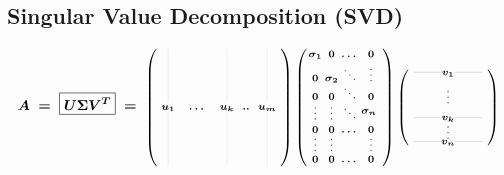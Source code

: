 \documentclass[12pt]{article}
\begin{document}
\newpage
\subsection{Singular Value Decomposition (SVD)}
\vspace{5pt}
\[ \boldsymbol{ \arraycolsep=3pt
	\begin{array}{c c c c l}
		A &=& \boxed{ U\Sigma V^T }
			&=& \text{\scriptsize\(\left(\arraycolsep=3pt \begin{array}{c c c c c}
				\rule[-20pt]{.05pt}{38pt} &\hspace{20pt}& \rule[-20pt]{.05pt}{38pt} & & \rule[-20pt]{.05pt}{38pt}\\
				u_1 & \dots & u_k & .. & u_m\\
				\rule[-20pt]{.05pt}{38pt} & &\rule[-20pt]{.05pt}{38pt}& & \rule[-20pt]{.05pt}{38pt}
			\end{array}\right)
			\left(\arraycolsep=1pt \begin{array}{c c c c}
				\sigma_1 & 0 & \dots & 0\\
				0 & \sigma_2 & \ddots & \vdots\\[-4pt]
				0 & 0 & \ddots & 0\\[-3pt]
				\vdots & \vdots & \ddots & \parbox{14pt}{\(\sigma_n\) \vspace{7pt}} \\
				0 & 0 & \dots & 0\\[-4pt]
				\vdots & \vdots & & \vdots\\
				0 & 0 & \dots & 0
			\end{array}\right)
			\left(\begin{array}{c}
				\rule[2pt]{20pt}{.1pt} v_1 \rule[2pt]{20pt}{.1pt}\\[-3pt]
				\hspace{5pt}\\[-2pt]
				\vdots\\[-2pt]
				\hspace{5pt}\\[-2pt]
				\rule[2pt]{20pt}{.1pt} v_k \rule[2pt]{20pt}{.1pt}\\[-4pt]
				\vdots\\[-4pt]
				\rule[2pt]{20pt}{.1pt} v_n \rule[2pt]{20pt}{.1pt}
			\end{array}\right)\)}

\end{array}}\]
\end{document}
